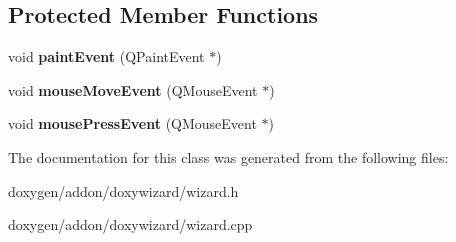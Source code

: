 \subsection*{Protected Member Functions}
\begin{DoxyCompactItemize}
\item 
\mbox{\label{class_color_picker_a120d9512f48096256f0db2c67c59e0c6}} 
void {\bfseries paint\+Event} (Q\+Paint\+Event $\ast$)
\item 
\mbox{\label{class_color_picker_a458a9356951e1cd6cd9d765a183d975c}} 
void {\bfseries mouse\+Move\+Event} (Q\+Mouse\+Event $\ast$)
\item 
\mbox{\label{class_color_picker_a48fc5f618b9ef036024e59aa35342a5c}} 
void {\bfseries mouse\+Press\+Event} (Q\+Mouse\+Event $\ast$)
\end{DoxyCompactItemize}


The documentation for this class was generated from the following files\+:\begin{DoxyCompactItemize}
\item 
doxygen/addon/doxywizard/wizard.\+h\item 
doxygen/addon/doxywizard/wizard.\+cpp\end{DoxyCompactItemize}
